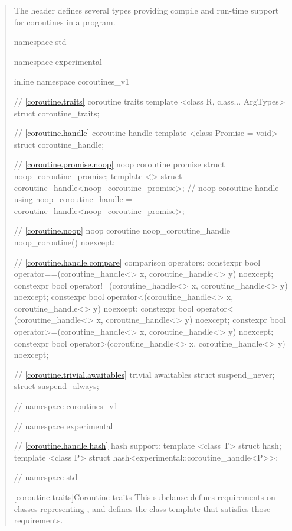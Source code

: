 \begin{quote}

\pnum
The header
defines several types providing compile and run-time support for coroutines in a \Cpp program.


%
%
\begin{codeblock}
namespace std {
namespace experimental {
inline namespace coroutines_v1 {

  // \ref{coroutine.traits} coroutine traits
  template <class R, class... ArgTypes>
    struct coroutine_traits;
  	
  // \ref{coroutine.handle} coroutine handle
  template <class Promise = void>
    struct coroutine_handle;		
  
  // \ref{coroutine.promise.noop} noop coroutine promise
  struct noop_coroutine_promise;
  template <> struct coroutine_handle<noop_coroutine_promise>;
  // noop coroutine handle
  using noop_coroutine_handle = coroutine_handle<noop_coroutine_promise>;
  
  // \ref{coroutine.noop} noop coroutine
  noop_coroutine_handle noop_coroutine() noexcept;

  // \ref{coroutine.handle.compare} comparison operators:	
  constexpr bool operator==(coroutine_handle<> x, coroutine_handle<> y) noexcept;
  constexpr bool operator!=(coroutine_handle<> x, coroutine_handle<> y) noexcept;
  constexpr bool operator<(coroutine_handle<> x, coroutine_handle<> y) noexcept;			
  constexpr bool operator<=(coroutine_handle<> x, coroutine_handle<> y) noexcept;			
  constexpr bool operator>=(coroutine_handle<> x, coroutine_handle<> y) noexcept;
  constexpr bool operator>(coroutine_handle<> x, coroutine_handle<> y) noexcept;
    
  // \ref{coroutine.trivial.awaitables} trivial awaitables
  struct suspend_never;
  struct suspend_always;
    
} // namespace coroutines_v1
} // namespace experimental

// \ref{coroutine.handle.hash} hash support:
template <class T> struct hash;
template <class P> struct hash<experimental::coroutine_handle<P>>;

} // namespace std
\end{codeblock}

[coroutine.traits]{Coroutine traits}
\pnum
This subclause defines requirements on classes representing
,
and defines the class template
that satisfies those requirements.


\end{quote}
